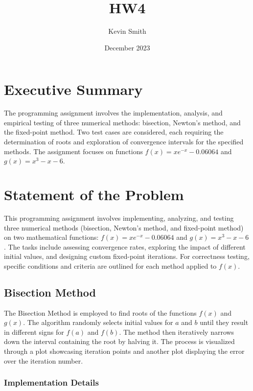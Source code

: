 \documentclass[12pt, letterpaper]{article}
\title{HW4}
\author{Kevin Smith}
\date{December 2023}
\begin{document}
\maketitle

\hspace{-.75cm} 

\section{Executive Summary}

The programming assignment involves the implementation, analysis, and empirical testing of three numerical methods: bisection, Newton's method, and the fixed-point method. Two test cases are considered, each requiring the determination of roots and exploration of convergence intervals for the specified methods. The assignment focuses on functions \(f(x) = xe^{-x} - 0.06064\) and \(g(x) = x^3 - x - 6\).

\section{Statement of the Problem}

This programming assignment involves implementing, analyzing, and testing three numerical methods (bisection, Newton's method, and fixed-point method) on two mathematical functions: \(f(x) = xe^{-x} - 0.06064\) and \(g(x) = x^3 - x - 6\). The tasks include assessing convergence rates, exploring the impact of different initial values, and designing custom fixed-point iterations. For correctness testing, specific conditions and criteria are outlined for each method applied to \(f(x)\).

\subsection*{Bisection Method}

The Bisection Method is employed to find roots of the functions \(f(x)\) and \(g(x)\). The algorithm randomly selects initial values for \(a\) and \(b\) until they result in different signs for \(f(a)\) and \(f(b)\). The method then iteratively narrows down the interval containing the root by halving it. The process is visualized through a plot showcasing iteration points and another plot displaying the error over the iteration number.

\subsubsection*{Implementation Details}
\end{document}

